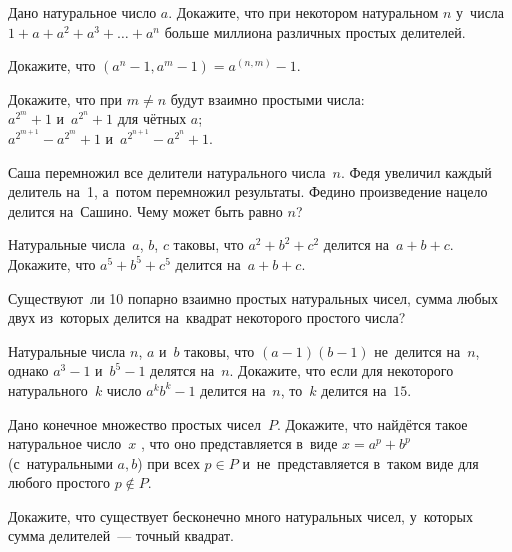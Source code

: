 


\begin{problems}

\item
Дано натуральное число $a$.
Докажите, что при некотором натуральном $n$ у~числа
$1 + a + a^{2} + a^{3} + \ldots + a^{n}$
больше миллиона различных простых делителей.

\item
Докажите, что $(a^{n} - 1, a^{m} - 1) = a^{(n,m)} - 1$.

\item
Докажите, что при $m \neq n$ будут взаимно простыми числа:
\\
\subproblem $a^{2^m} + 1$ и~$a^{2^n} + 1$ для чётных $a$;
\\
\subproblem $a^{2^{m+1}} - a^{2^m} + 1$ и~$a^{2^{n+1}} - a^{2^n} + 1$.

\item
Саша перемножил все делители натурального числа~$n$.
Федя увеличил каждый делитель на~1, а~потом перемножил результаты.
Федино произведение нацело делится на~Сашино.
Чему может быть равно $n$?

\item
Натуральные числа~$a$, $b$, $c$ таковы, что $a^2 + b^2 + c^2$ делится
на~$a + b + c$.
Докажите, что $a^5 + b^5 + c^5$ делится на~$a + b + c$.

\item
Существуют~ли 10 попарно взаимно простых натуральных чисел, сумма любых двух
из~которых делится на~квадрат некоторого простого числа?

\item
Натуральные числа $n$, $a$ и~$b$ таковы, что $(a - 1) (b - 1)$ не~делится
на~$n$, однако $a^{3} - 1$ и~$b^{5} - 1$ делятся на~$n$.
Докажите, что если для некоторого натурального~$k$ число $a^{k} b^{k} - 1$
делится на~$n$, то~$k$ делится на~$15$.

\item
Дано конечное множество простых чисел~$P$.
Докажите, что найдётся такое натуральное число~$x$ , что оно представляется
в~виде $x = a^{p} + b^{p}$ (с~натуральными $a, b$) при всех $p \in P$  
и~не~представляется в~таком виде для любого простого $p \notin P$.

\item
Докажите, что существует бесконечно много натуральных чисел, у~которых сумма
делителей~--- точный квадрат.

\end{problems}

